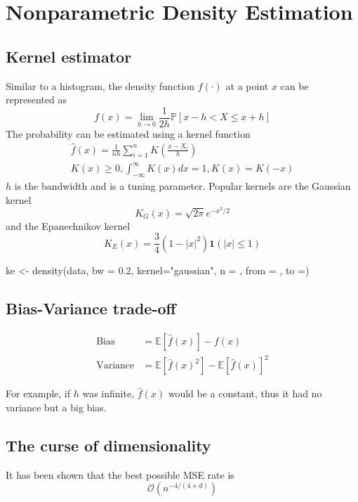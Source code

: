 \section{Nonparametric Density Estimation}
\subsection{Kernel estimator}
\begin{theory}
Similar to a histogram, the density function $f(\cdot)$ at a point $x$ can be represented as
\begin{equation*}
 f(x) = \lim_{h\to 0} \frac{1}{2h} \mathbb{P}[x-h < X \leq x+h]
\end{equation*}
The probability can be estimated using a kernel function
\begin{gather*}
 \hat{f}(x) = \frac{1}{nh} \sum_{i=1}^n K \left( \frac{x - X_i}{h} \right) \\
 K(x) \geq 0, \int_{-\infty}^{\infty} K(x) dx = 1, K(x) = K(-x)
\end{gather*}
$h$ is the bandwidth and is a tuning parameter. Popular kernels are the Gaussian kernel
\begin{equation*}
 K_G(x) = \sqrt{2\pi} e^{-x^2 / 2}
\end{equation*}
and the Epanechnikov kernel
\begin{equation*}
 K_E(x) = \frac{3}{4} \left( 1 - |x|^2 \right) \mathbf{1} (|x| \leq 1)
\end{equation*}
\end{theory}
\begin{code}
 ke <- density(data, bw = 0.2, kernel="gaussian", n = , from = , to =)
\end{code}


\subsection{Bias-Variance trade-off}
\begin{align*}
 \text{Bias} &= \mathbb{E}[\hat{f}(x)] - f(x)\\
 \text{Variance} &= \mathbb{E}[\hat{f}(x)^2] - \mathbb{E}[\hat{f}(x)]^2
\end{align*}

For example, if $h$ was infinite, $\hat{f}(x)$ would be a constant, thus it had no variance but a big bias.

\subsection{The curse of dimensionality}
It has been shown that the best possible MSE rate is
\begin{equation*}
 \mathcal{O}(n^{-4/(4+d)})
\end{equation*}
